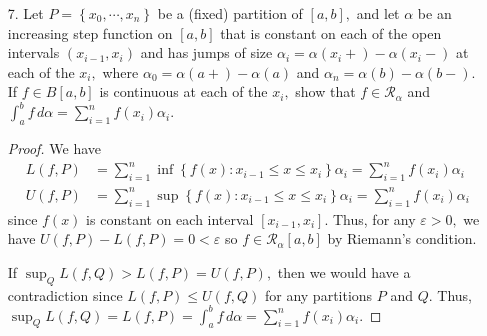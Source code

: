 \documentclass{article}
\begin{document}
\begin{itemize}
\begin{enumerate}[(a)]
		\end{enumerate}

	\item[7.] Let $P=\left\{ x_0, \cdots, x_n \right\}$ be a (fixed) partition of $[a, b],$ and let $\alpha$ be an increasing step function on $[a, b]$ that is constant on each of the open intervals $(x_{i-1}, x_i)$ and has jumps of size $\alpha_i=\alpha(x_i+)-\alpha(x_i-)$ at each of the $x_i,$ where $\alpha_0=\alpha(a+)-\alpha(a)$ and $\alpha_n=\alpha(b)-\alpha(b-).$ If $f\in B[a, b]$ is continuous at each of the $x_i,$ show that $f\in\mathcal R_\alpha$ and $\int_a^b f\, d\alpha=\sum_{i=1}^{n} f(x_i)\alpha_i.$
		\begin{proof}
			We have
			\begin{align*}
				L(f, P) &= \sum_{i=1}^{n} \inf\left\{ f(x):x_{i-1}\le x\le x_i \right\}\alpha_i = \sum_{i=1}^{n} f(x_i)\alpha_i \\
				U(f, P) &= \sum_{i=1}^{n} \sup\left\{ f(x):x_{i-1}\le x\le x_i \right\}\alpha_i = \sum_{i=1}^{n} f(x_i)\alpha_i
			\end{align*}
			since $f(x)$ is constant on each interval $[x_{i-1}, x_i].$ Thus, for any $\varepsilon>0,$ we have $U(f, P)-L(f, P)=0<\varepsilon$ so $f\in\mathcal R_\alpha[a, b]$ by Riemann's condition.

			If $\sup_Q L(f, Q)> L(f, P)=U(f, P),$ then we would have a contradiction since $L(f, P)\le U(f, Q)$ for any partitions $P$ and $Q.$ Thus, $\sup_Q L(f, Q) = L(f, P)=\int_a^b f\, d\alpha=\sum_{i=1}^{n} f(x_i)\alpha_i.$
		\end{proof}


\end{itemize}
\end{document}
